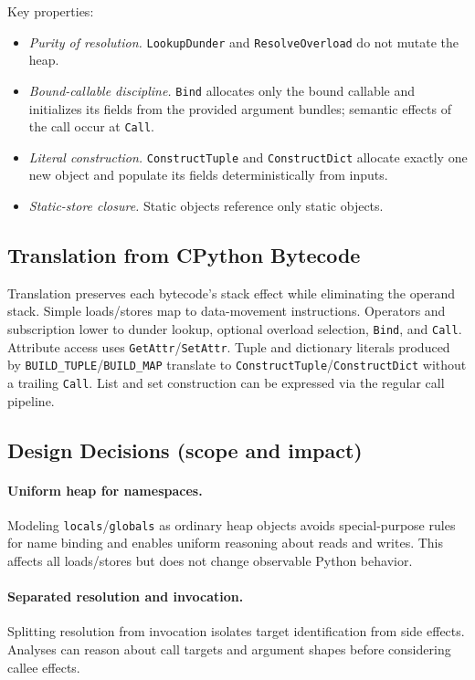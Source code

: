 Key properties:
\begin{itemize}
\item \emph{Purity of resolution.} \texttt{LookupDunder} and \texttt{ResolveOverload} do not mutate the heap.
\item \emph{Bound-callable discipline.} \texttt{Bind} allocates only the bound callable and initializes its fields from the provided argument bundles; semantic effects of the call occur at \texttt{Call}.
\item \emph{Literal construction.} \texttt{ConstructTuple} and \texttt{ConstructDict} allocate exactly one new object and populate its fields deterministically from inputs.
\item \emph{Static-store closure.} Static objects reference only static objects.
\end{itemize}

\subsection{Translation from CPython Bytecode}

Translation preserves each bytecode’s stack effect while eliminating the operand stack. Simple loads/stores map to data-movement instructions. Operators and subscription lower to dunder lookup, optional overload selection, \texttt{Bind}, and \texttt{Call}. Attribute access uses \texttt{GetAttr}/\texttt{SetAttr}. Tuple and dictionary literals produced by \texttt{BUILD\_TUPLE}/\texttt{BUILD\_MAP} translate to \texttt{ConstructTuple}/\texttt{ConstructDict} without a trailing \texttt{Call}. List and set construction can be expressed via the regular call pipeline.

\subsection{Design Decisions (scope and impact)}

\paragraph{Uniform heap for namespaces.}
Modeling \texttt{locals}/\texttt{globals} as ordinary heap objects avoids special-purpose rules for name binding and enables uniform reasoning about reads and writes. This affects all loads/stores but does not change observable Python behavior.

\paragraph{Separated resolution and invocation.}
Splitting resolution from invocation isolates target identification from side effects. Analyses can reason about call targets and argument shapes before considering callee effects.

